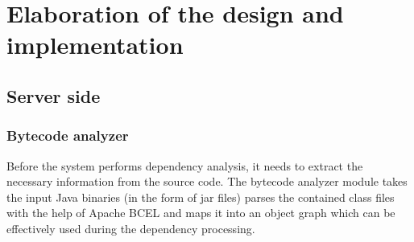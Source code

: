 \chapter{Elaboration of the design and implementation}


\section{Server side}\label{sect:elabserver}


\subsection{Bytecode analyzer}\label{sect:bcanalyzer}
Before the system performs dependency analysis, it needs to extract the
necessary information from the source code.
The bytecode analyzer module takes the input Java binaries (in the form of jar
files) parses the contained class files with the help of Apache BCEL and maps it
into an object graph which can be effectively used during the dependency
processing.

